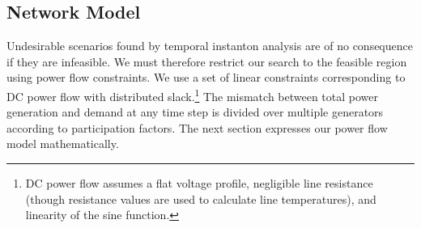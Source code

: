 \documentclass[journal,twoside]{IEEEtran}
\begin{document}
\subsection{Network Model}\label{sec:models-network}
Undesirable scenarios found by temporal instanton analysis are of no consequence if they are infeasible. We must therefore restrict our search to the feasible region using power flow constraints. We use a set of linear constraints corresponding to DC power flow with distributed slack.\footnote{DC power flow assumes a flat voltage profile, negligible line resistance (though resistance values are used to calculate line temperatures), and linearity of the sine function.} The mismatch between total power generation and demand at any time step is divided over multiple generators according to participation factors. The next section expresses our power flow model mathematically.
\end{document}
